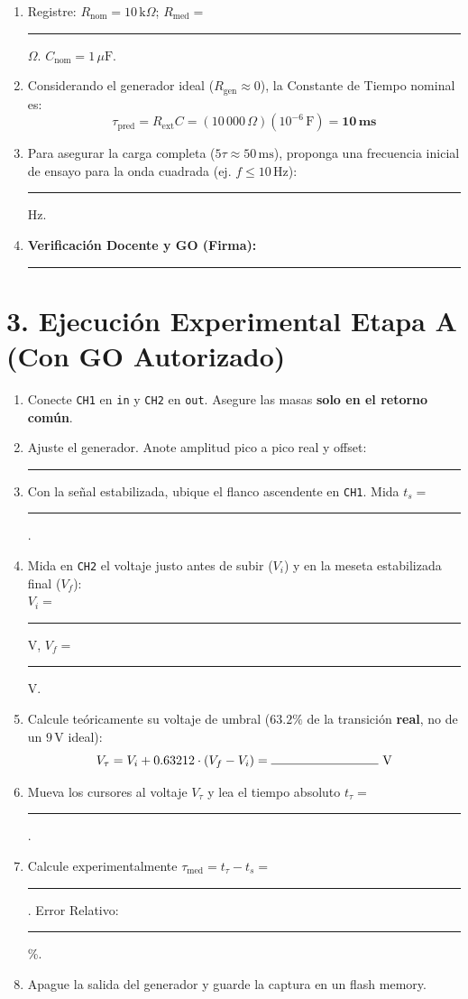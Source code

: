 \documentclass[11pt, a4paper]{article}
\begin{document}
\begin{enumerate}\setlength\itemsep{0.25cm}
    \item Registre: $R_{\text{nom}} = 10\,\text{k}\Omega$; $R_{\text{med}} =$ \rule{2.5cm}{0.4pt} $\Omega$. $C_{\text{nom}} = 1\,\mu\text{F}$.
    \item Considerando el generador ideal ($R_{\text{gen}} \approx 0$), la Constante de Tiempo nominal es:
    $$ \tau_{\text{pred}} = R_{\text{ext}} C = (10\,000\,\Omega)(10^{-6}\,\text{F}) = \mathbf{10\,\text{ms}} $$
    \item Para asegurar la carga completa ($5\tau \approx 50\,\text{ms}$), proponga una frecuencia inicial de ensayo para la onda cuadrada (ej. $f \le 10\,\text{Hz}$): \rule{3cm}{0.4pt} Hz.
    \item \textbf{Verificación Docente y GO (Firma):} \rule{5cm}{0.4pt}
\end{enumerate}

\section*{3. Ejecución Experimental Etapa A (Con GO Autorizado)}
\begin{enumerate}\setlength\itemsep{0.25cm}
    \item Conecte \texttt{CH1} en \texttt{in} y \texttt{CH2} en \texttt{out}. Asegure las masas \textbf{solo en el retorno común}.
    \item Ajuste el generador. Anote amplitud pico a pico real y offset: \rule{4cm}{0.4pt}
    \item Con la señal estabilizada, ubique el flanco ascendente en \texttt{CH1}. Mida $t_s =$ \rule{2cm}{0.4pt}.
    \item Mida en \texttt{CH2} el voltaje justo antes de subir ($V_i$) y en la meseta estabilizada final ($V_f$): \\
    $V_i =$ \rule{2cm}{0.4pt} V, \quad $V_f =$ \rule{2cm}{0.4pt} V.
    \item Calcule teóricamente su voltaje de umbral ($63.2\%$ de la transición \textbf{real}, no de un $9\,\text{V}$ ideal):
    $$ V_{\tau} = V_i + 0.63212 \cdot (V_f - V_i) = \rule{3cm}{0.4pt} \text{ V} $$
    \item Mueva los cursores al voltaje $V_{\tau}$ y lea el tiempo absoluto $t_{\tau} =$ \rule{2cm}{0.4pt}.
    \item Calcule experimentalmente $\tau_{\text{med}} = t_{\tau} - t_s =$ \rule{3cm}{0.4pt}. Error Relativo: \rule{2cm}{0.4pt}\%.
    \item Apague la salida del generador y guarde la captura en un flash memory.
\end{enumerate}
\end{document}
